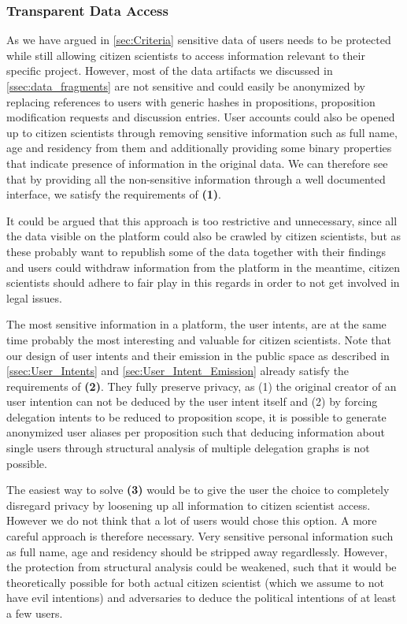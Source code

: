 \subsubsection{Transparent Data Access}
\label{sec:Model_ResearchersAccess}

As we have argued in \autoref{sec:Criteria} sensitive data of users needs to be protected while still allowing citizen scientists to access information relevant to their specific project.
However, most of the data artifacts we discussed in \autoref{ssec:data_fragments} are not sensitive and could easily be anonymized by replacing references to users with generic hashes in propositions, proposition modification requests and discussion entries.
User accounts could also be opened up to citizen scientists through removing sensitive information such as full name, age and residency from them and additionally providing some binary properties that indicate presence of information in the original data.
We can therefore see that by providing all the non-sensitive information through a well documented interface, we satisfy the requirements of \textbf{(1)}.

It could be argued that this approach is too restrictive and unnecessary, since all the data visible on the platform could also be crawled by citizen scientists, but as these probably want to republish some of the data together with their findings and users could withdraw information from the platform in the meantime, citizen scientists should adhere to fair play in this regards in order to not get involved in legal issues.

The most sensitive information in a  platform, the user intents, are at the same time probably the most interesting and valuable for citizen scientists.
Note that our design of user intents and their emission in the public space as described in \autoref{ssec:User_Intents} and \autoref{sec:User_Intent_Emission} already satisfy the requirements of \textbf{(2)}.
They fully preserve privacy, as (1) the original creator of an user intention can not be deduced by the user intent itself and (2) by forcing delegation intents to be reduced to proposition scope, it is possible to generate anonymized user aliases per proposition such that deducing information about single users through structural analysis of multiple delegation graphs is not possible.

The easiest way to solve \textbf{(3)} would be to give the user the choice to completely disregard privacy by loosening up all information to citizen scientist access.
However we do not think that a lot of users would chose this option.
A more careful approach is therefore necessary.
Very sensitive personal information such as full name, age and residency should be stripped away regardlessly.
However, the protection from structural analysis could be weakened, such that it would be theoretically possible for both actual citizen scientist (which we assume to not have evil intentions) and adversaries to deduce the political intentions of at least a few users.

